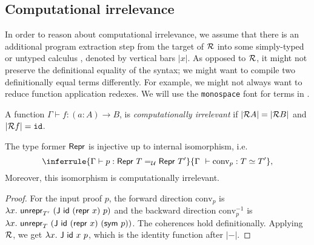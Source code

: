 \subsection{Computational irrelevance}\label{sub:irr}

In order to reason about computational irrelevance, we assume that there is
an additional program extraction step from the target of $\mathcal{R}$ into some
simply-typed or untyped calculus \lambdaprog, denoted by vertical bars $|x|$. As opposed to
$\mathcal{R}$, it might not preserve the definitional equality of the syntax;
we might want to compile two definitionally equal terms differently. For
example, we might not always want to reduce function application redexes. We
will use the \texttt{monospace} font for terms in \lambdaprog.

\begin{definition}
    A function $\Gamma \vdash f : (a : A) \to B$, is \emph{computationally irrelevant} if
    $|\mathcal{R} A| = |\mathcal{R} B|$ and $|\mathcal{R} f| = \texttt{id}$.
\end{definition}

\begin{theorem}\label{thm:repr-inj}
	The type former $\textsf{Repr}{}$ is injective up to internal isomorphism, i.e.
	\begin{equation}
	\inferrule{\Gamma \vdash p : \MRepr\ T =_{\univ} \MRepr\ T'}{\Gamma\ \vdash \text{conv}_p : T \simeq T'},
	\end{equation}
	Moreover, this isomorphism is computationally irrelevant.
	\begin{proof}
	For the input proof $p$, the forward direction $\text{conv}_p$ is
	$\lambda x.\ \Munrepr_{T'}\ (\mta{J}\ \mta{id}\ (\Mrepr\ x)\ p)$
	and the backward direction $\text{conv}_p^{-1}$ is
	$\lambda x.\ \Munrepr_{T}\ (\mta{J}\ \mta{id}\ (\Mrepr\ x)\ (\mta{sym}\
	p))$. The coherences hold definitionally. Applying $\mathcal{R}$, we get $\lambda x.\
	\textsf{J}\ \textsf{id}\ x\ p$, which is the identity function after $|-|$.
	\end{proof}
\end{theorem}

